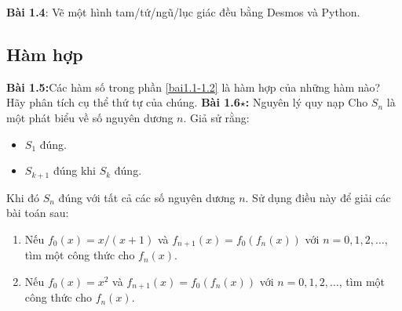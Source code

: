 \textbf{Bài 1.4}: Vẽ một hình tam/tứ/ngũ/lục giác đều bằng Desmos và Python.

\subsection*{Hàm hợp}
\textbf{Bài 1.5:}Các hàm số trong phần \ref{bai1.1-1.2} là hàm hợp của những hàm nào? Hãy phân tích cụ thể thứ tự của chúng.
\textbf{Bài 1.6\(\star\):} Nguyên lý quy nạp\newline
Cho $S_n$ là một phát biểu về số nguyên dương $n$. Giả sử rằng:
\begin{itemize}
    \item $S_1$ đúng.
    \item $S_{k+1}$ đúng khi $S_k$ đúng.
\end{itemize}
Khi đó $S_n$ đúng với tất cả các số nguyên dương $n$.\newline
Sử dụng điều này để giải các bài toán sau:
\begin{enumerate}[label=(\alph*)]
\item Nếu $f_0(x) =x/(x+1)$ và $f_{n+1}(x)=f_0(f_n(x))$ với $n=0, 1, 2,\dots$, tìm một công thức cho $f_n(x)$.
\item Nếu $f_0(x) =x^2$ và $f_{n+1}(x)=f_0(f_n(x))$ với $n=0, 1, 2,\dots$, tìm một công thức cho $f_n(x)$.
\end{enumerate}




